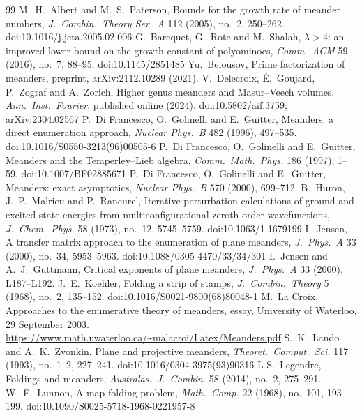 \documentclass[11pt]{amsart}
\theoremstyle{definition}
\begin{document}
\begin{thebibliography}{99}
 M.~H.~Albert and M.~S.~Paterson, Bounds for the growth rate of meander numbers, \emph{J.\ Combin.\ Theory Ser.\ A} 112 (2005), no.~2, 250--262. doi:10.1016/j.jcta.2005.02.006
 G.~Barequet, G.~Rote and M.~Shalah, $\lambda>4$: an improved lower bound on the growth constant of polyominoes, \emph{Comm.\ ACM} 59 (2016), no.~7, 88--95. doi:10.1145/2851485
 Yu.~Belousov, Prime factorization of meanders, preprint, arXiv:2112.10289 (2021).
 V.~Delecroix, \'E.~Goujard, P.~Zograf and A.~Zorich, Higher genus meanders and Masur--Veech volumes, \emph{Ann.\ Inst.\ Fourier}, published online (2024). doi:10.5802/aif.3759; arXiv:2304.02567
 P.~Di Francesco, O.~Golinelli and E.~Guitter, Meanders: a direct enumeration approach, \emph{Nuclear Phys.\ B} 482 (1996), 497--535. doi:10.1016/S0550-3213(96)00505-6
 P.~Di Francesco, O.~Golinelli and E.~Guitter, Meanders and the Temperley--Lieb algebra, \emph{Comm.\ Math.\ Phys.} 186 (1997), 1--59. doi:10.1007/BF02885671
 P.~Di Francesco, O.~Golinelli and E.~Guitter, Meanders: exact asymptotics, \emph{Nuclear Phys.\ B} 570 (2000), 699--712.
 B.~Huron, J.~P.~Malrieu and P.~Rancurel, Iterative perturbation calculations of ground and excited state energies from multiconfigurational zeroth-order wavefunctions, \emph{J.\ Chem.\ Phys.} 58 (1973), no.~12, 5745--5759. doi:10.1063/1.1679199
 I.~Jensen, A transfer matrix approach to the enumeration of plane meanders, \emph{J.\ Phys.\ A} 33 (2000), no.~34, 5953--5963. doi:10.1088/0305-4470/33/34/301
 I.~Jensen and A.~J.~Guttmann, Critical exponents of plane meanders, \emph{J.\ Phys.\ A} 33 (2000), L187--L192.
 J.~E.~Koehler, Folding a strip of stamps, \emph{J.\ Combin.\ Theory} 5 (1968), no.~2, 135--152. doi:10.1016/S0021-9800(68)80048-1
 M.~La Croix, Approaches to the enumerative theory of meanders, essay, University of Waterloo, 29 September 2003. \url{https://www.math.uwaterloo.ca/~malacroi/Latex/Meanders.pdf}
 S.~K.~Lando and A.~K.~Zvonkin, Plane and projective meanders, \emph{Theoret.\ Comput.\ Sci.} 117 (1993), no.~1--2, 227--241. doi:10.1016/0304-3975(93)90316-L
 S.~Legendre, Foldings and meanders, \emph{Australas.\ J.\ Combin.} 58 (2014), no.~2, 275--291.
 W.~F.~Lunnon, A map-folding problem, \emph{Math.\ Comp.} 22 (1968), no.~101, 193--199. doi:10.1090/S0025-5718-1968-0221957-8

\end{thebibliography}
\end{document}
